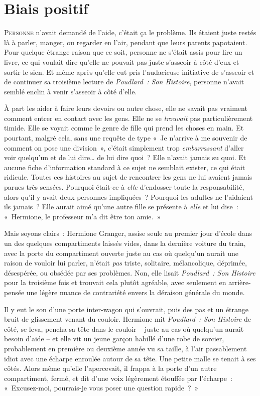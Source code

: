\chapter{Biais positif}

\lettrine{P}{ersonne} n'avait demandé de l'aide, c'était ça le problème. Ils étaient juste restés là à parler, manger, ou regarder en l'air, pendant que leurs parents papotaient. Pour quelque étrange raison que ce soit, personne ne s'était assis pour lire un livre, ce qui voulait dire qu'elle ne pouvait pas juste s'asseoir à côté d'eux et sortir le sien. Et même après qu'elle eut pris l'audacieuse initiative de s'asseoir et de continuer sa troisième lecture de \emph{Poudlard~: Son Histoire}, personne n'avait semblé enclin à venir s'asseoir à côté d'elle.

À part les aider à faire leurs devoirs ou autre chose, elle ne savait pas vraiment comment entrer en contact avec les gens. Elle ne se \emph{trouvait} pas particulièrement timide. Elle se voyait comme le genre de fille qui prend les choses en main. Et pourtant, malgré cela, sans une requête de type «~Je n'arrive à me souvenir de comment on pose une division~», c'était simplement trop \emph{embarrassant} d'aller voir quelqu'un et de lui dire… de lui dire quoi~? Elle n'avait jamais su quoi. Et aucune fiche d'information standard à ce sujet ne semblait exister, ce qui était ridicule. Toutes ces histoires au sujet de rencontrer les gens ne lui avaient jamais parues très sensées. Pourquoi était-ce à \emph{elle} d'endosser toute la responsabilité, alors qu'il y avait deux personnes impliquées~? Pourquoi les adultes ne l'aidaient-ils jamais~? Elle aurait aimé qu'une autre fille se présente à \emph{elle} et lui dise~: «~Hermione, le professeur m'a dit être ton amie.~»

Mais soyons clairs~: Hermione Granger, assise seule au premier jour d'école dans un des quelques compartiments laissés vides, dans la dernière voiture du train, avec la porte du compartiment ouverte juste au cas où quelqu'un aurait une raison de vouloir lui parler, n'était \emph{pas} triste, solitaire, mélancolique, déprimée, désespérée, ou obsédée par ses problèmes. Non, elle lisait \emph{Poudlard~: Son Histoire} pour la troisième fois et trouvait cela plutôt agréable, avec seulement en arrière-pensée une légère nuance de contrariété envers la déraison générale du monde.

Il y eut le son d'une porte inter-wagon qui s'ouvrait, puis des pas et un étrange bruit de glissement venant du couloir. Hermione mit \emph{Poudlard~: Son Histoire} de côté, se leva, pencha sa tête dans le couloir -- juste au cas où quelqu'un aurait besoin d'aide -- et elle vit un jeune garçon habillé d’une robe de sorcier, probablement en première ou deuxième année vu sa taille, à l'air passablement idiot avec une écharpe enroulée autour de sa tête. Une petite malle se tenait à ses côtés. Alors même qu'elle l'apercevait, il frappa à la porte d'un autre compartiment, fermé, et dit d'une voix légèrement étouffée par l'écharpe~: «~Excusez-moi, pourrais-je vous poser une question rapide~?~»

